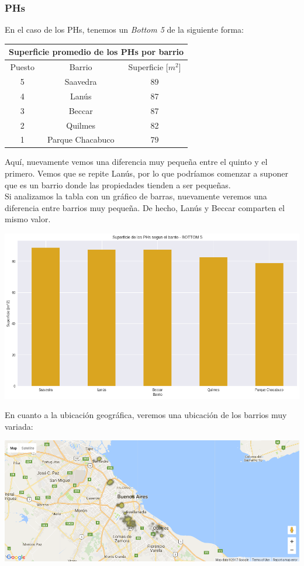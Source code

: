 \documentclass[a4paper, 10pt]{article}
\newcommand\tab[1][0.5cm]{\hspace*{#1}}
\begin{document}
				\subsubsection{PHs}
					En el caso de los PHs, tenemos un \emph{Bottom 5} de la siguiente forma:
					\begin{center}
						\begin{tabular}{ |c|c|c| }
							\hline
							\multicolumn{3}{|c|}{Superficie promedio de los PHs por barrio}\\
							\hline
							\hline
							Puesto & Barrio & Superficie [$m^2$]\\
							\hline
							5 & Saavedra & 89\\
							4 & Lanús & 87\\
							3 & Beccar & 87\\
							2 & Quilmes & 82\\
							1 & Parque Chacabuco & 79\\
							\hline
						\end{tabular}
					\end{center}
					\tab Aquí, nuevamente vemos una diferencia muy pequeña entre el quinto y el primero. Vemos que se repite Lanús,
					por lo que podríamos comenzar a suponer que es un barrio donde las propiedades tienden a ser pequeñas. \\
					\tab Si analizamos la tabla con un gráfico de barras, nuevamente veremos una diferencia entre barrios muy 
					pequeña. De hecho, Lanús y Beccar comparten el mismo valor.
					\begin{center}
   		    				\includegraphics[width=\textwidth]{../images/phSurfaceBottomBar}
				  	\end{center}
				  	\tab En cuanto a la ubicación geográfica, veremos una ubicación de los barrios muy variada:
				  	\begin{center}
   		    				\includegraphics[width=\textwidth]{../images/phSurfaceBottomMap}
				  	\end{center}
\end{document}
